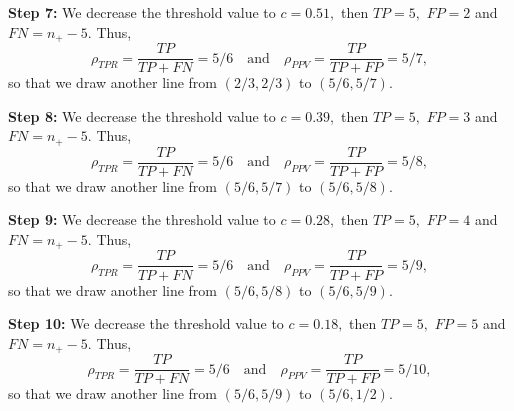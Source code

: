 \documentclass[a4paper]{article}
\begin{document}
{\begin{minipage}{0.5\textwidth}
	\textbf{Step 7:}
We decrease the threshold value to $c=0.51,$ then $TP=5,$ $FP=2$ and $FN= n_+ - 5.$
%
Thus, 
%
%
$$  \rho_{TPR} = \frac{TP}{TP+FN} = 5/6 \quad \mbox{and} \quad \rho_{PPV} = \frac{TP}{TP + FP} =  5/7, $$
%
so that we draw another line from $(2/3,2/3)$ to $(5/6,5/7).$
%
\end{minipage}
\begin{minipage}{0.45\textwidth}
\centering
{}
\end{minipage}

\begin{minipage}{0.5\textwidth}
	\textbf{Step 8:}
We decrease the threshold value to $c=0.39,$ then $TP=5,$ $FP=3$ and $FN= n_+ - 5.$
%
Thus, 
%
%
$$  \rho_{TPR} = \frac{TP}{TP+FN} = 5/6 \quad \mbox{and} \quad \rho_{PPV} = \frac{TP}{TP + FP} =  5/8, $$
%
so that we draw another line from $(5/6,5/7)$ to $(5/6,5/8).$
%
\end{minipage}
\begin{minipage}{0.45\textwidth}
\centering
{}
\end{minipage}

\begin{minipage}{0.5\textwidth}
	\textbf{Step 9:}
We decrease the threshold value to $c=0.28,$ then $TP=5,$ $FP=4$ and $FN= n_+ - 5.$
%
Thus, 
%
%
$$  \rho_{TPR} = \frac{TP}{TP+FN} = 5/6 \quad \mbox{and} \quad \rho_{PPV} = \frac{TP}{TP + FP} =  5/9, $$
%
so that we draw another line from $(5/6,5/8)$ to $(5/6,5/9).$
%
\end{minipage}
\begin{minipage}{0.45\textwidth}
\centering
{}
\end{minipage}

\begin{minipage}{0.5\textwidth}
	\textbf{Step 10:}
We decrease the threshold value to $c=0.18,$ then $TP=5,$ $FP=5$ and $FN= n_+ - 5.$
%
Thus, 
%
%
$$  \rho_{TPR} = \frac{TP}{TP+FN} = 5/6 \quad \mbox{and} \quad \rho_{PPV} = \frac{TP}{TP + FP} =  5/10, $$
%
so that we draw another line from $(5/6,5/9)$ to $(5/6,1/2).$
%
\end{minipage}
\begin{minipage}{0.45\textwidth}
\centering
{}
\end{minipage}

}
\end{document}
